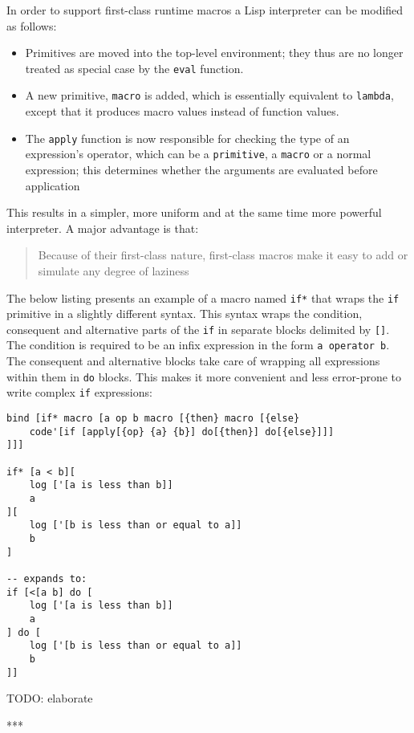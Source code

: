 In order to support first-class runtime macros a Lisp interpreter can be modified as follows\cite{macros}:
\begin{itemize}
	\item Primitives are moved into the top-level environment; they thus are no longer treated as special case by the \texttt{eval} function.
	\item A new primitive, \texttt{macro} is added, which is essentially equivalent to \texttt{lambda}, except that it produces macro values instead of function values.
	\item The \texttt{apply} function is now responsible for checking the type of an expression's operator, which can be a \texttt{primitive}, a \texttt{macro} or a normal expression; this determines whether the arguments are evaluated before application
\end{itemize}

This results in a simpler, more uniform and at the same time more powerful interpreter. A major advantage is that:
\begin{quote}
Because of their first-class nature, first-class macros make it easy to add or simulate any degree of laziness\cite{macros}
\end{quote}

The below listing presents an example of a macro named \texttt{if*} that wraps the \texttt{if} primitive in a slightly different syntax. This syntax wraps the condition, consequent and alternative parts of the \texttt{if} in separate blocks delimited by \texttt{[]}. The condition is required to be an infix expression in the form \texttt{a operator b}. The consequent and alternative blocks take care of wrapping all expressions within them in \texttt{do} blocks. This makes it more convenient and less error-prone to write complex \texttt{if} expressions:
\begin{lstlisting}
bind [if* macro [a op b macro [{then} macro [{else}
	code'[if [apply[{op} {a} {b}] do[{then}] do[{else}]]]
]]]

if* [a < b][
	log ['[a is less than b]]
	a
][
	log ['[b is less than or equal to a]]
	b
]

-- expands to:
if [<[a b] do [
	log ['[a is less than b]]
	a
] do [
	log ['[b is less than or equal to a]]
	b
]]
\end{lstlisting}

TODO: elaborate

***

